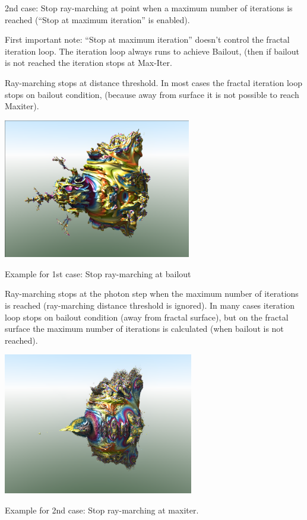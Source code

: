 \protect\hypertarget{__DdeLink__1111_813559202}{}{}2nd case: Stop
ray-marching at point when a maximum number of iterations is reached
(``Stop at maximum iteration'' is enabled).

First important note: ``Stop at maximum iteration'' doesn't control the
fractal iteration loop. The iteration loop always runs to achieve
Bailout, (then if bailout is not reached the iteration stops at
Max-Iter.

Ray-marching stops at distance threshold. In most cases the fractal
iteration loop stops on bailout condition, (because away from surface it
is not possible to reach Maxiter).

\includegraphics[width=3.22795in,height=2.40000in]{img/manual/media/image7.png}

Example for 1st case: Stop ray-marching at bailout

Ray-marching stops at the photon step when the maximum number of
iterations is reached (ray-marching distance threshold is ignored). In
many cases iteration loop stops on bailout condition (away from fractal
surface), but on the fractal surface the maximum number of iterations is
calculated (when bailout is not reached).

\includegraphics[width=3.26890in,height=2.44016in]{img/manual/media/image8.png}

Example for 2nd case: Stop ray-marching at maxiter.

